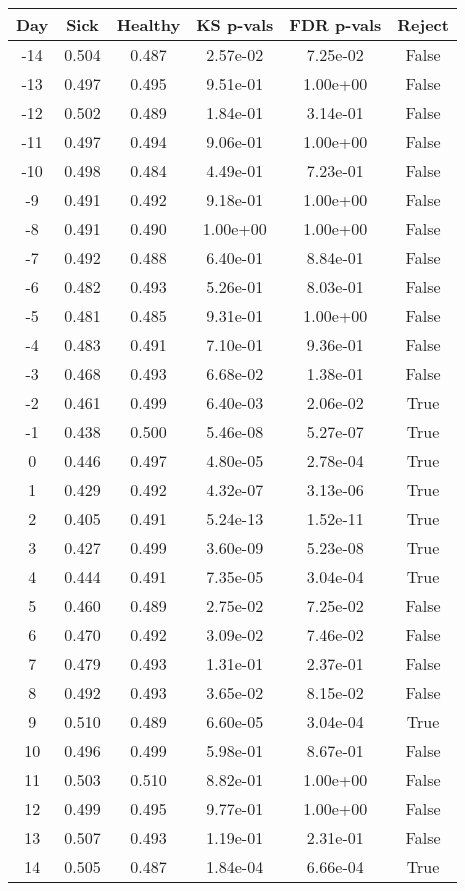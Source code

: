 \begin{tabular}{c|c|c|c|c|c}
Day &  Sick & Healthy &  KS p-vals & FDR p-vals & Reject\\
\hline
-14 & 0.504 &   0.487 &   2.57e-02 &   7.25e-02 &  False\\
-13 & 0.497 &   0.495 &   9.51e-01 &   1.00e+00 &  False\\
-12 & 0.502 &   0.489 &   1.84e-01 &   3.14e-01 &  False\\
-11 & 0.497 &   0.494 &   9.06e-01 &   1.00e+00 &  False\\
-10 & 0.498 &   0.484 &   4.49e-01 &   7.23e-01 &  False\\
 -9 & 0.491 &   0.492 &   9.18e-01 &   1.00e+00 &  False\\
 -8 & 0.491 &   0.490 &   1.00e+00 &   1.00e+00 &  False\\
 -7 & 0.492 &   0.488 &   6.40e-01 &   8.84e-01 &  False\\
 -6 & 0.482 &   0.493 &   5.26e-01 &   8.03e-01 &  False\\
 -5 & 0.481 &   0.485 &   9.31e-01 &   1.00e+00 &  False\\
 -4 & 0.483 &   0.491 &   7.10e-01 &   9.36e-01 &  False\\
 -3 & 0.468 &   0.493 &   6.68e-02 &   1.38e-01 &  False\\
 -2 & 0.461 &   0.499 &   6.40e-03 &   2.06e-02 &   True\\
 -1 & 0.438 &   0.500 &   5.46e-08 &   5.27e-07 &   True\\
  0 & 0.446 &   0.497 &   4.80e-05 &   2.78e-04 &   True\\
  1 & 0.429 &   0.492 &   4.32e-07 &   3.13e-06 &   True\\
  2 & 0.405 &   0.491 &   5.24e-13 &   1.52e-11 &   True\\
  3 & 0.427 &   0.499 &   3.60e-09 &   5.23e-08 &   True\\
  4 & 0.444 &   0.491 &   7.35e-05 &   3.04e-04 &   True\\
  5 & 0.460 &   0.489 &   2.75e-02 &   7.25e-02 &  False\\
  6 & 0.470 &   0.492 &   3.09e-02 &   7.46e-02 &  False\\
  7 & 0.479 &   0.493 &   1.31e-01 &   2.37e-01 &  False\\
  8 & 0.492 &   0.493 &   3.65e-02 &   8.15e-02 &  False\\
  9 & 0.510 &   0.489 &   6.60e-05 &   3.04e-04 &   True\\
 10 & 0.496 &   0.499 &   5.98e-01 &   8.67e-01 &  False\\
 11 & 0.503 &   0.510 &   8.82e-01 &   1.00e+00 &  False\\
 12 & 0.499 &   0.495 &   9.77e-01 &   1.00e+00 &  False\\
 13 & 0.507 &   0.493 &   1.19e-01 &   2.31e-01 &  False\\
 14 & 0.505 &   0.487 &   1.84e-04 &   6.66e-04 &   True\\
\end{tabular}